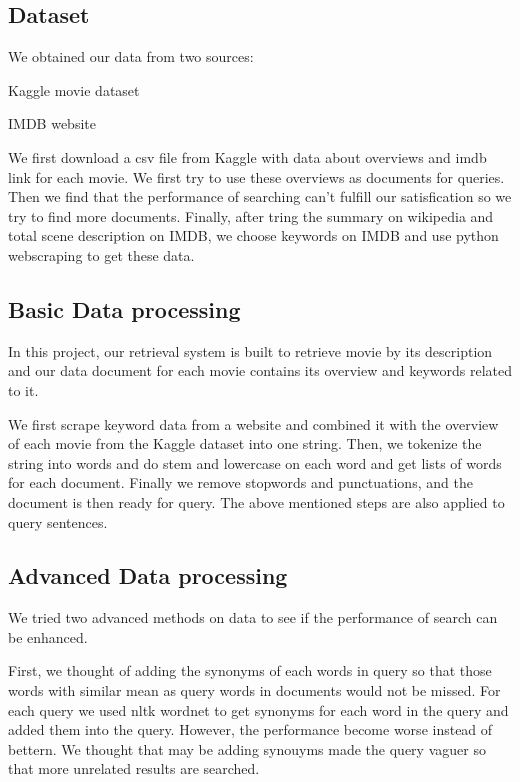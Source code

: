 \documentclass[sigconf,nonacm]{acmart}
\begin{document}
\subsection{Dataset}
We obtained our data from two sources:

Kaggle movie dataset\cite{kaggle1}

IMDB website\cite{imdb1}

We first download a csv file from Kaggle with data about overviews and imdb link for each movie. We first try to use these overviews as documents for queries. Then we find that the performance of searching can't fulfill our satisfication so we try to find more documents. Finally, after tring the summary on wikipedia and total scene description on IMDB, we choose keywords on IMDB and use python webscraping to get these data.

\subsection{Basic Data processing}

In this project, our retrieval system is built to retrieve movie by its description and our data document for each movie contains its overview and keywords related to it.

We first scrape keyword data from a website and combined it with the overview of each movie from the Kaggle dataset into one string. Then, we tokenize the string into words and do stem and lowercase on each word and get lists of words for each document. Finally we remove stopwords and punctuations, and  the document is then ready for query. The above mentioned steps are also applied to query sentences.

\subsection{Advanced Data processing}

We tried two advanced methods on data to see if the performance of search can be enhanced.

First, we thought of adding the synonyms of each words in query so that those words with similar mean as query words in documents would not be missed. For each query we used nltk wordnet to get synonyms for each word in the query and added them into the query. However, the performance become worse instead of bettern. We thought that may be adding synouyms made the query vaguer so that more unrelated results are searched.
\end{document}
